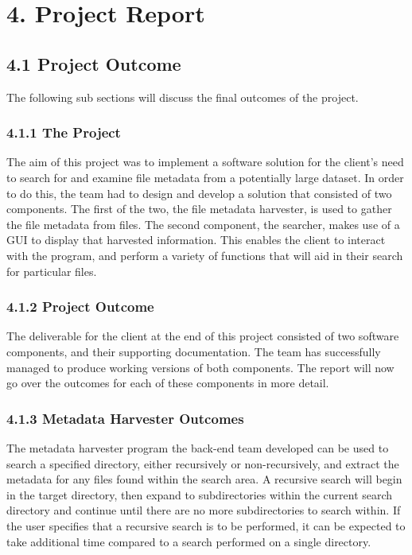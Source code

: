 \documentclass[11pt]{article}
\begin{document}

\section{4. Project Report}
\subsection{4.1 Project Outcome}
The following sub sections will discuss the final outcomes of the project.

\begin{adjustwidth}{1cm}{}

\subsubsection{4.1.1 The Project}
The aim of this project was to implement a software solution for the client’s need to search for and examine file metadata from a potentially large dataset. In order to do this, the team had to design and develop a solution that consisted of two components. The first of the two, the file metadata harvester, is used to gather the file metadata from files. The second component, the searcher, makes use of a GUI to display that harvested information. This enables the client to interact with the program, and perform a variety of functions that will aid in their search for particular files.

\subsubsection{4.1.2 Project Outcome} 
The deliverable for the client at the end of this project consisted of two software components, and their supporting documentation. The team has successfully managed to produce working versions of both components. The report will now go over the outcomes for each of these components in more detail.

\subsubsection{4.1.3 Metadata Harvester Outcomes}
The metadata harvester program the back-end team developed can be used to search a specified directory, either recursively or non-recursively, and extract the metadata for any files found within the search area. A recursive search will begin in the target directory, then expand to subdirectories within the current search directory and continue until there are no more subdirectories to search within. If the user specifies that a recursive search is to be performed, it can be expected to take additional time compared to a search performed on a single directory. \\


\end{adjustwidth}
\end{document}
